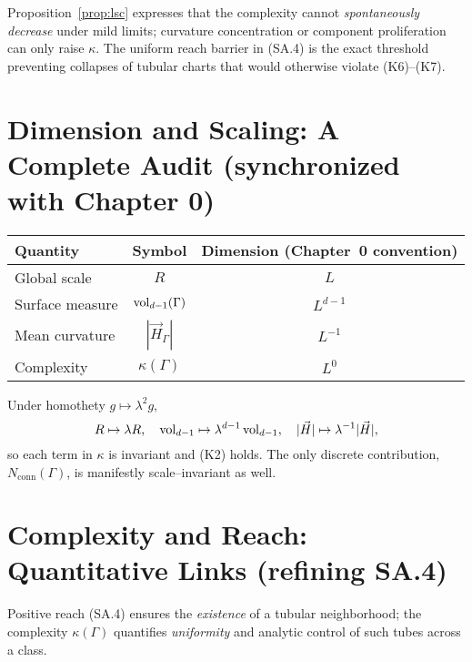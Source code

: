 \begin{remark}
Proposition~\ref{prop:lsc} expresses that the complexity cannot \emph{spontaneously decrease} under mild limits; curvature concentration or component proliferation can only raise $\kappa$. The uniform reach barrier in (SA.4) is the exact threshold preventing collapses of tubular charts that would otherwise violate (K6)–(K7).
\end{remark}

\bigskip

\section{Dimension and Scaling: A Complete Audit (synchronized with Chapter 0)}
\label{sec:dim-audit}

\begin{center}
\renewcommand{\arraystretch}{1.12}
\begin{tabular}{|l|c|c|}
\hline
Quantity & Symbol & Dimension (Chapter~0 convention) \\
\hline
Global scale & $R$ & $L$ \\
Surface measure & $\operatorname{vol}_{d-1}(\Gamma)$ & $L^{d-1}$ \\
Mean curvature & $|\vec H_\Gamma|$ & $L^{-1}$ \\
Complexity & $\kappa(\Gamma)$ & $L^0$ \\
\hline
\end{tabular}
\end{center}

Under homothety $g\mapsto \lambda^2 g$,
\[
R\mapsto \lambda R,\quad
\operatorname{vol}_{d-1}\mapsto \lambda^{d-1}\operatorname{vol}_{d-1},\quad
|\vec H|\mapsto \lambda^{-1}|\vec H|,
\]
so each term in $\kappa$ is invariant and (K2) holds. The only discrete contribution, $N_{\mathrm{conn}}(\Gamma)$, is manifestly scale–invariant as well.

\bigskip

\section{Complexity and Reach: Quantitative Links (refining SA.4)}
\label{sec:reach-links}

Positive reach (SA.4) ensures the \emph{existence} of a tubular neighborhood; the complexity $\kappa(\Gamma)$ quantifies \emph{uniformity} and analytic control of such tubes across a class.

